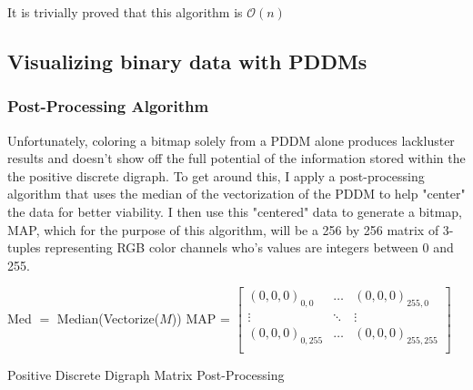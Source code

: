 \documentclass[12pt,a4paper]{article}
\begin{document}
It is trivially proved that this algorithm is $\mathcal{O}(n)$ 
\subsection{Visualizing binary data with PDDMs}
\subsubsection{Post-Processing Algorithm}
Unfortunately, coloring a bitmap solely from a PDDM alone produces lackluster results and doesn't show off the full potential of the information stored within the the positive discrete digraph. To get around this, I apply a post-processing algorithm that uses the median of the vectorization of the PDDM to help "center" the data for better viability. I then use this "centered" data to generate a bitmap, MAP, which for the purpose of this algorithm, will be a 256 by 256 matrix of 3-tuples representing RGB color channels who's values are integers between 0 and 255. 

\begin{algorithm}
\DontPrintSemicolon
{}
\BlankLine
Med $=$ Median(Vectorize($M$))\;
MAP = $\begin{bmatrix}(0,0,0)_{0,0} & \ldots & (0,0,0)_{255,0}\\\vdots &\ddots&\vdots\\(0,0,0)_{0,255} & \ldots & (0,0,0)_{255,255}\\\end{bmatrix}$\;
\caption{Positive Discrete Digraph Matrix Post-Processing}
\end{algorithm}
\end{document}
